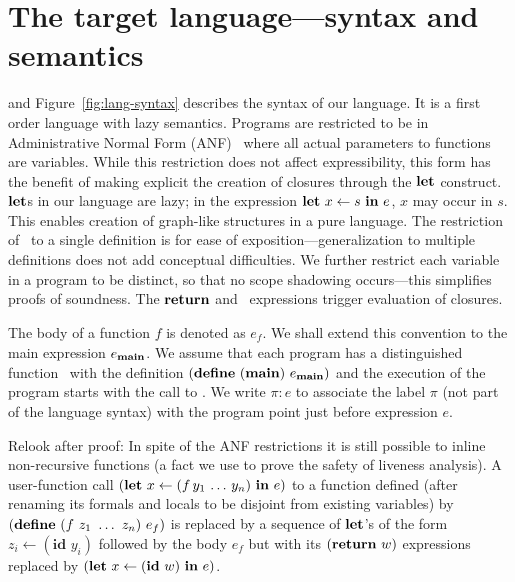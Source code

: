 \documentclass[9pt]{sigplanconf}
\newcommand{\ID}{\mbox{$\mathbf{ id}$}} %
\begin{document}
\section{The target language---syntax and semantics}
\label{sec:defs}
and
Figure~\ref{fig:lang-syntax} describes the  syntax of our language. It
is a first order language with lazy semantics. Programs are restricted
to        be        in        Administrative        Normal        Form
(ANF)~\cite{chakravarty03perspective}  where all actual  parameters to
functions  are  variables.  While  this  restriction  does not  affect
expressibility,  this form  has  the benefit  of  making explicit  the
creation  of closures through  the $\mbox{$\mathbf{ let}$}$  construct.  $\mbox{$\mathbf{ let}$}$s  in our
language  are lazy;  in the  expression $\mbox{$\mathbf{ let}$}\,\,  x  \leftarrow s\,\,
\mbox{$\mathbf{ in}$}\,\, e$, $x$ may occur  in $s$. This enables creation of graph-like
structures in  a pure language. The  restriction of \LET\  to a single
definition  is  for ease  of  exposition---generalization to  multiple
definitions  does  not add conceptual  difficulties.  We  further
restrict each variable  in a program to be distinct,  so that no scope
shadowing   occurs---this  simplifies   proofs   of  soundness.    The
$\mbox{$\mathbf{ return}$}$ and \SIF\ expressions trigger evaluation of closures.

The body  of a function ${\mathit  f}$ is denoted  as $e_{\mathit f}$.
We   shall   extend   this   convention   to   the   main   expression
$e_{\mathbf{main}}$. We assume that each program has a distinguished function
\mainpgm\      with      the      definition     $(\mbox{$\mathbf{define}$}\      ({\tt
  \mathbf{main}})\  e_{\mathbf{main}})$ and  the execution  of the  program starts
with the call to \mainpgm.  We write $\pi\!:\!e$ to associate the label
$\pi$ (not  part of the language  syntax) with the  program point just
before expression $e$.

{ \color {Myblue} Relook after proof: In spite of the  ANF restrictions
it
  is still possible  to inline non-recursive functions (a  fact we use
  to  prove the safety  of liveness  analysis).  A  user-function call
  $(\mbox{$\mathbf{ let}$}\,\, x \leftarrow (f\,y_1\,\ldots\,y_n)  \,\, \mbox{$\mathbf{ in}$}\,\, e)$ to a
  function  defined  (after renaming  its  formals  and  locals to  be
  disjoint         from         existing         variables)         by
  $(\mbox{$\mathbf{define}$}\ (f\ z_1\ \ldots\ z_n)\ e_f)$ is replaced by a sequence of
  $\mbox{$\mathbf{ let}$}$'s of  the form  $z_i\leftarrow (\ID\,\,y_i)$ followed  by the
  body $e_f$  but with  its $(\mbox{$\mathbf{ return}$}\,\,w)$ expressions  replaced by
  $(\LET\,\, x \leftarrow (\ID\,\, w) \,\, \IN\,\, e)$.}
\end{document}
